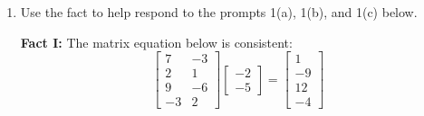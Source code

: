 \documentclass[basic]{inVerba-notes}
\begin{document}
\begin{enumerate}[align=left, leftmargin=0pt, labelindent=\parindent, listparindent=\parindent, labelwidth=0pt, itemindent=!]\color{minor}
  \item Use the fact to help respond to the prompts 1(a), 1(b), and 1(c) below.
  
  \textbf{Fact I:} The matrix equation below is consistent:
  \[%
  \begin{bmatrix}7 & -3\\2 & 1\\9 & -6\\-3 & 2 \end{bmatrix}
  \begin{bmatrix}-2\\-5\end{bmatrix}
  =
  \begin{bmatrix}1\\-9\\12\\-4\end{bmatrix}
  \]%


\end{enumerate}
\end{document}
